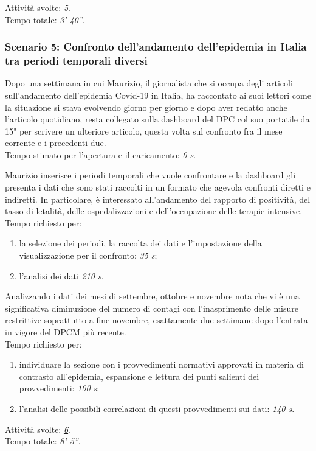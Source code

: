 \noindent
Attività svolte: \hyperref[itm:5]{\textit{5}}.\\  
Tempo totale: \textit{3' 40''}. 

\subsubsection*{Scenario 5: Confronto dell'andamento dell'epidemia in Italia tra periodi temporali diversi}
Dopo una settimana in cui Maurizio, il giornalista che si occupa degli articoli sull'andamento dell'epidemia Covid-19 in Italia, ha raccontato ai suoi lettori come la situazione si stava evolvendo giorno per giorno e dopo aver redatto anche l'articolo quotidiano, resta collegato sulla dashboard del DPC col suo portatile da 15" per scrivere un ulteriore articolo, questa volta sul confronto fra il mese corrente e i precedenti due.\\
Tempo stimato per l'apertura e il caricamento: \textit{0 s}.

Maurizio inserisce i periodi temporali che vuole confrontare e la dashboard gli presenta i dati che sono stati raccolti in un formato che agevola confronti diretti e indiretti. In particolare, è interessato all'andamento del rapporto di positività, del tasso di letalità, delle ospedalizzazioni e dell'occupazione delle terapie intensive.\\
Tempo richiesto per:
\begin{enumerate}
    \item la selezione dei periodi, la raccolta dei dati e l'impostazione della visualizzazione per il confronto: \textit{35 s};
    \item l'analisi dei dati \textit{210 s}.
\end{enumerate}

Analizzando i dati dei mesi di settembre, ottobre e novembre nota che vi è una significativa diminuzione del numero di contagi con l'inasprimento delle misure restrittive soprattutto a fine novembre, esattamente due settimane dopo l'entrata in vigore del DPCM più recente.\\
Tempo richiesto per:
\begin{enumerate}
    \item individuare la sezione con i provvedimenti normativi approvati in materia di contrasto all'epidemia, espansione e lettura dei punti salienti dei provvedimenti: \textit{100 s};
    \item l'analisi delle possibili correlazioni di questi provvedimenti sui dati: \textit{140 s}.
\end{enumerate}
\noindent
Attività svolte: \hyperref[itm:6]{\textit{6}}.\\ 
Tempo totale: \textit{8' 5''}. 
